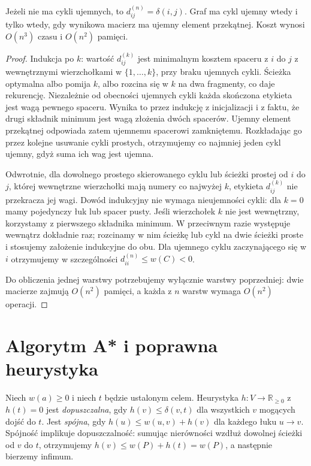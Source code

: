 \begin{twierdzenie}
\label{thm:tg-weighted-floyd}
Jeżeli nie ma cykli ujemnych,
to $d^{(n)}_{ij}=\delta(i,j)$.
Graf ma cykl ujemny wtedy i tylko
wtedy, gdy wynikowa macierz ma
ujemny element przekątnej.
Koszt wynosi $O(n^3)$ czasu
i $O(n^2)$ pamięci.
\end{twierdzenie}
\begin{proof}
Indukcja po $k$: wartość $d^{(k)}_{ij}$
jest minimalnym kosztem spaceru
z $i$ do $j$ z wewnętrznymi
wierzchołkami w $\{1,\ldots,k\}$,
przy braku ujemnych cykli.
Ścieżka optymalna albo pomija $k$,
albo rozcina się w $k$ na dwa
fragmenty, co daje rekurencję.
Niezależnie od obecności ujemnych cykli każda
skończona etykieta jest wagą pewnego spaceru.
Wynika to przez indukcję z inicjalizacji i z faktu,
że drugi składnik minimum jest wagą złożenia dwóch
spacerów. Ujemny element przekątnej odpowiada zatem
ujemnemu spacerowi zamkniętemu. Rozkładając go
przez kolejne usuwanie cykli prostych, otrzymujemy
co najmniej jeden cykl ujemny, gdyż suma ich wag
jest ujemna.

Odwrotnie, dla dowolnego prostego skierowanego
cyklu lub ścieżki prostej od $i$ do $j$, której
wewnętrzne wierzchołki mają numery co najwyżej $k$,
etykieta $d^{(k)}_{ij}$ nie przekracza jej wagi.
Dowód indukcyjny nie wymaga nieujemności cykli:
dla $k=0$ mamy pojedynczy łuk lub spacer pusty.
Jeśli wierzchołek $k$ nie jest wewnętrzny, korzystamy
z pierwszego składnika minimum. W przeciwnym razie
występuje wewnątrz dokładnie raz; rozcinamy w nim
ścieżkę lub cykl na dwie ścieżki proste i stosujemy
założenie indukcyjne do obu. Dla ujemnego cyklu
zaczynającego się w $i$ otrzymujemy w szczególności
$d^{(n)}_{ii}\leq w(C)<0$.

Do obliczenia jednej warstwy potrzebujemy wyłącznie
warstwy poprzedniej: dwie macierze zajmują $O(n^2)$
pamięci, a każda z $n$ warstw wymaga $O(n^2)$ operacji.
\end{proof}

\section{Algorytm A* i poprawna heurystyka}
\label{sec:tg-weighted-astar}

Niech $w(a)\geq0$ i niech
$t$ będzie ustalonym celem.
Heurystyka $h\colon V\to\mathbb R_{\geq0}$
z $h(t)=0$ jest \emph{dopuszczalna},
gdy $h(v)\leq\delta(v,t)$
dla wszystkich $v$ mogących
dojść do $t$. Jest \emph{spójna},
gdy $h(u)\leq w(u,v)+h(v)$
dla każdego łuku $u\to v$.
Spójność implikuje dopuszczalność: sumując nierówności
wzdłuż dowolnej ścieżki od $v$ do $t$, otrzymujemy
$h(v)\leq w(P)+h(t)=w(P)$, a następnie bierzemy infimum.

